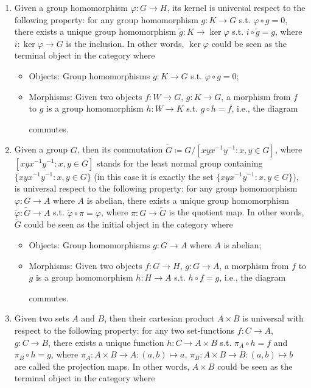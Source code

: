 \begin{example}
	\begin{enumerate}[label=(\roman*)]
		\item Given a group homomorphism $\varphi:G\to H$, its kernel is universal respect to the following property: for any group homomorphism $g:K\to G$ s.t. $\varphi\circ g=0$, there exists a unique group homomorphism $\tilde g:K\to \ker \varphi$ s.t. $i\circ\tilde g=g$, where $i:\ker\varphi\to G$ is the inclusion. In other words, $\ker \varphi$ could be seen as the terminal object in the category where
			\begin{itemize}
				\item Objects: Group homomorphisms $g:K\to G$ s.t. $\varphi\circ g=0$;
				\item Morphisms: Given two objects $f:W\to G$, $g:K\to G$, a morphism from $f$ to $g$ is a group homomorphism $h:W\to K$ s.t. $g\circ h=f$, i.e., the diagram
				commutes.
			\end{itemize}
		\item Given a group $G$, then its commutation $\tilde G\coloneqq G/[xyx^{-1}y^{-1}:x,y\in G]$, where $[xyx^{-1}y^{-1}:x,y\in G]$ stands for the least normal group containing $\{xyx^{-1}y^{-1}:x,y\in G\}$ (in this case it is exactly the set $\{xyx^{-1}y^{-1}:x,y\in G\}$), is universal respect to the following property: for any group homomorphism $\varphi:G\to A$ where $A$ is abelian, there exists a unique group homomorphism $\tilde \varphi:\tilde G\to A$ s.t. $\tilde\varphi\circ\pi=\varphi$, where $\pi:G\to \tilde G$ is the quotient map. In other words, $\tilde G$ could be seen as the initial object in the category where
			\begin{itemize}
				\item Objects: Group homomorphisms $g:G\to A$ where $A$ is abelian;
				\item Morphisms: Given two objects $f:G\to H$, $g:G\to A$, a morphism from $f$ to $g$ is a group homomorphism $h:H\to A$ s.t. $h\circ f=g$, i.e., the diagram
				commutes.
				\end{itemize}
		\item Given two sets $A$ and $B$, then their cartesian product $A\times B$ is universal with respect to the following property: for any two set-functions $f:C\to A$, $g:C\to B$, there exists a unique function $h:C\to A\times B$ s.t. $\pi_A\circ h=f$ and $\pi_B\circ h=g$, where $\pi_A:A\times B\to A:(a,b)\mapsto a$, $\pi_B:A\times B\to B:(a,b)\mapsto b$ are called the projection maps. In other words, $A\times B$ could be seen as the terminal object in the category where

\end{enumerate}
\end{example}
